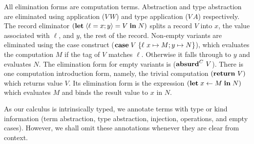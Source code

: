 \documentclass[12pt,phd,lfcs,twoside,openright,logo,leftchapter,normalheadings]{infthesis}
\theoremstyle{plain}
\theoremstyle{definition}
\begin{document}
All elimination forms are computation terms. Abstraction and type
abstraction are eliminated using application ($V\,W$) and type
application ($V\,A$) respectively.
%
The record eliminator $(\mathbf{let} \; \langle \ell=x;y \rangle = V \; \mathbf{in} \; N)$
splits a record $V$ into $x$, the value associated with $\ell$, and
$y$, the rest of the record. Non-empty variants are eliminated using
the case construct ($\mathbf{case}\; V\; \{\ell~x \mapsto M; y \mapsto N\}$),
which evaluates the computation $M$ if the tag of $V$ matches
$\ell$. Otherwise it falls through to $y$ and evaluates $N$.  The
elimination form for empty variants is ($\mathbf{absurd}^C~V$).
%
There is one computation introduction form, namely, the trivial
computation $(\mathbf{return}~V)$ which returns value $V$. Its elimination
form is the expression $(\mathbf{let} \; x \leftarrow M \; \mathbf{in} \; N)$ which evaluates
$M$ and binds the result value to $x$ in $N$.
%

%
As our calculus is intrinsically typed, we annotate terms with type or
kind information (term abstraction, type abstraction, injection,
operations, and empty cases). However, we shall omit these annotations
whenever they are clear from context.
\end{document}
